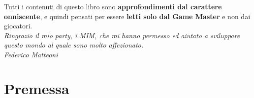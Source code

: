 \documentclass[10pt,twoside,onecolumn,openany]{book}
\begin{document}
\selectfont %
\begin{Large}
\begin{center}
Tutti i contenuti di questo libro sono \textbf{approfondimenti dal carattere onniscente}, e quindi pensati per essere \textbf{letti solo dal Game Master} e non dai giocatori.\\
\textit{Ringrazio il mio party, i MIM, che mi hanno permesso ed aiutato a sviluppare questo mondo al quale sono molto affezionato.\\Federico Matteoni}
\end{center}
\end{Large}
\pagebreak
\chapter{Premessa}
\end{document}
